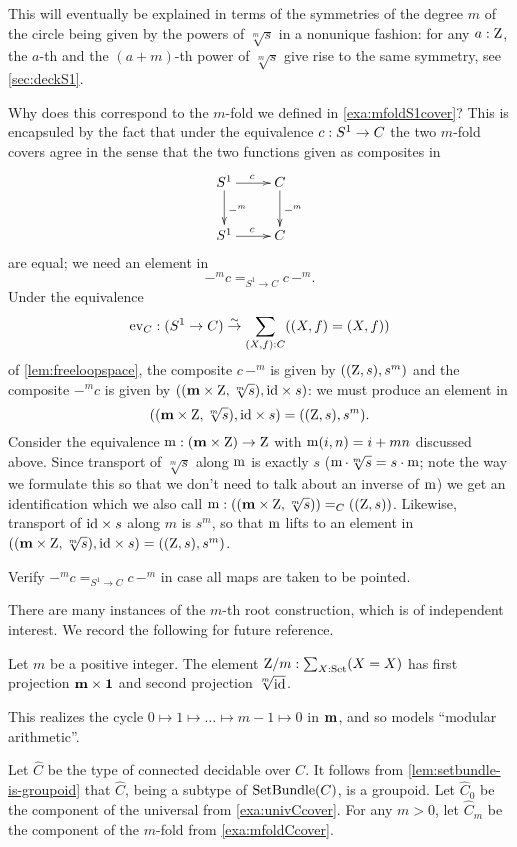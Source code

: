 \begin{example}
This will eventually be explained in terms of the symmetries of the 
degree $m$ \covering of the circle being given by the powers of $\sqrt[m]s$ in a 
nonunique fashion: for any $a:\mathrm{Z}$, the $a$-th and the $(a+m)$-th power of 
$\sqrt[m]s$ give rise to the same symmetry, see \cref{sec:deckS1}.

Why does this correspond to the $m$-fold \covering we defined in \cref{exa:mfoldS1cover}?  
This is encapsuled by the fact that under the equivalence $c:{S^1}\to C$ the two $m$-fold covers agree in the sense that the two functions given as composites in
$$\xymatrix{\Sc\ar[r]^c\ar[d]^{-^m}&C\ar[d]^{-^m}\\\Sc\ar[r]^c&C}$$ 
are equal; we need an element in
$$-^mc=_{S^1\to C}c\,-^m.$$
Under the equivalence 
$$\mathrm{ev}_C:(S^1\to C)\overset\sim\to \sum_{(X,f):C}((X,f)=(X,f))$$ of \cref{lem:freeloopspace}, 
the composite $c\,-^m$ is given by $((\mathrm{Z},s),s^m)$
and the composite $-^mc$ is given by
$((\mathbf{m}\times\mathrm{Z},\sqrt[m]s),\mathord{\mathrm{id}}\times s)$: we must produce an element in 
$$((\mathbf{m}\times\mathrm{Z},\sqrt[m]s),\mathord{\mathrm{id}}\times s)=((\mathrm{Z},s),s^m).$$
Consider the equivalence  $\mathop{\mathrm{m}}: (\mathbf{m}\times \mathrm{Z})\to\mathrm{Z}$ with $\mathop{\mathrm{m}}(i,n)=i+mn$ discussed above.  Since transport of $\sqrt[m]s$ along $\mathop{\mathrm{m}}$ is exactly $s$ (\ie $\mathop{\mathrm{m}}\cdot\sqrt[m]s=s\cdot\mathop{\mathrm{m}}$; 
note the way we formulate this so that we don't need to talk about an inverse of $\mathop{\mathrm{m}}$) we get an identification which we also call $\mathop{\mathrm{m}}:((\mathbf{m}\times\mathrm{Z},\sqrt[m]s))=_C((\mathrm{Z},s))$.  Likewise, transport of $\mathord{\mathrm{id}}\times s$ along $m$ is $s^m$, so that $\mathop{\mathrm{m}}$ lifts to an element in
$((\mathbf{m}\times\mathrm{Z},\sqrt[m]s),\mathord{\mathrm{id}}\times s)=((\mathrm{Z},s),s^m)$.
\end{example}

\begin{xca}\label{xca:pointed-maps-circle}
Verify $-^mc=_{S^1\to C}c\,-^m$ in case all maps are taken to be pointed. 
\end{xca}

There are many instances of the $m$-th root construction, which is of independent interest.  
We record the following for future reference.
\begin{definition} \label{def:Zetmodm}
Let $m$ be a positive integer.
The element $\mathrm{Z}/m:\sum_{X:\mathord{\mathrm{Set}}}(X=X)$ has first projection $\mathbf{m}\times\mathbf{1}$ and 
second projection $\sqrt[m]{\mathord{\mathrm{id}}}$.
\end{definition}
\noindent
This realizes the cycle $0\mapsto1\mapsto\dots\mapsto m-1\mapsto 0$ in $\mathbf{m}$, 
and so models ``modular arithmetic''.

\begin{definition} \label{def:hatC}
Let $\hat C$ be the type of connected decidable \coverings over $C$.
It follows from \cref{lem:setbundle-is-groupoid} that $\hat C$, 
being a subtype of $\operatorname{\mathrm{SetBundle}}(C)$, is a groupoid.
Let $\hat C_0$ be the component of the universal \covering
from \cref{exa:univCcover}. For any $m>0$, let $\hat C_m$ be the component of 
the $m$-fold \covering from \cref{exa:mfoldCcover}.
\end{definition}

